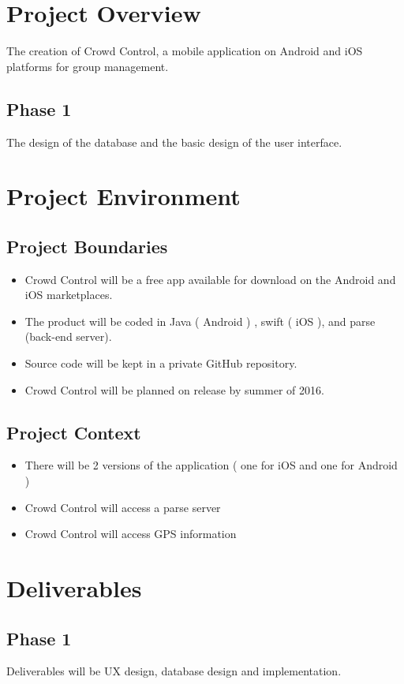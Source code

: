 \documentclass[11pt]{article}
\begin{document}
\section*{Project Overview}
The creation of Crowd Control, a mobile application on Android and iOS platforms for group management.

\subsection*{Phase 1}
The design of the database and the basic design of the user interface.

\section*{Project Environment}

\subsection*{Project Boundaries}
	\begin{itemize}
	\item Crowd Control will be a free app available for download on the Android and iOS marketplaces.
	\item The product will be coded in Java ( Android ) , swift ( iOS ), and parse (back-end server).
	\item Source code will be kept in a private GitHub repository.
	\item Crowd Control will be planned on release by summer of 2016.
	\end{itemize}
	
\subsection*{Project Context}
	\begin{itemize}
	\item There will be 2 versions of the application ( one for iOS and one for Android )
	\item Crowd Control will access a parse server
	\item Crowd Control will access GPS information
	\end{itemize}

\section*{Deliverables}

\subsection*{Phase 1}
Deliverables will be UX design, database design and implementation.
\end{document}
